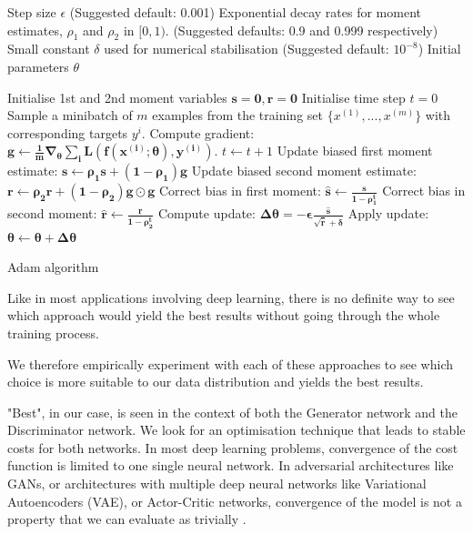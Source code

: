 \begin{algorithm}[ht]
\begin{algorithmic}
    Step size $\epsilon$ (Suggested default: 0.001)
    Exponential decay rates for moment estimates, $\rho_1$ and $\rho_2$ in $[0,1)$. (Suggested defaults: 0.9 and 0.999 respectively)
    Small constant $\delta$ used for numerical stabilisation (Suggested default: $10^{-8}$)
    Initial parameters $\theta$
   
   \STATE Initialise 1st and 2nd moment variables $\mathbf{s=0, r=0}$
   \STATE Initialise time step $t=0$
   \STATE Sample a minibatch of $m$ examples from the training set $\{x^{(1)},...,x^{(m)}\}$ with corresponding targets $y^{i}$.
   \STATE Compute gradient: $\boldsymbol{g \leftarrow \frac{1}{m}\nabla_\theta \sum_i L(f(x^{(i)}; \theta), y^{(i)}).}$
   \STATE $t \leftarrow t + 1$
   \STATE Update biased first moment estimate: $\boldsymbol{s \leftarrow \rho_1 s + (1-\rho_1) g}$
   \STATE Update biased second moment estimate: $\boldsymbol{r \leftarrow \rho_2 r + (1-\rho_2) g \odot g}$
   \STATE Correct bias in first moment: $\boldsymbol{\hat{s} \leftarrow \frac{s}{1-\rho_1^t}}$
   \STATE Correct bias in second moment: $\boldsymbol{\hat{r} \leftarrow \frac{r}{1-\rho_2^t}}$
   \STATE Compute update: $\boldsymbol{\Delta \theta = -\epsilon \frac{\hat{s}}{\sqrt{\hat{r}} + \delta}}$
   \STATE Apply update: $\boldsymbol{\theta \leftarrow \theta + \Delta \theta}$
   \ENDWHILE
\end{algorithmic}
  \caption{Adam algorithm}
  \label{alg:Adam}
\end{algorithm}

Like in most applications involving deep learning, there is no definite way to see which approach would yield the best results without going through the whole training process.

We therefore empirically experiment with each of these approaches to see which choice is more suitable to our data distribution and yields the best results.

"Best", in our case, is seen in the context of both the Generator network and the Discriminator network. We look for an optimisation technique that leads to stable costs for both networks. In most deep learning problems, convergence of the cost function is limited to one single neural network. In adversarial architectures like GANs, or architectures with multiple deep neural networks like Variational Autoencoders (VAE), or Actor-Critic networks, convergence of the model is not a property that we can evaluate as trivially \citep{kingma2013auto, grondman2012survey}.

